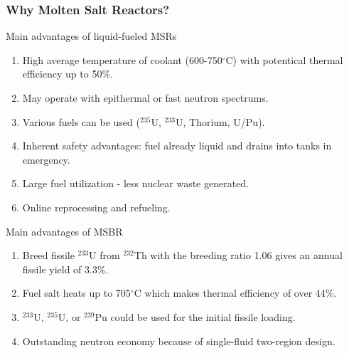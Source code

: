 \begin{frame}
  \frametitle{Why Molten Salt Reactors?}
                  \vspace*{-0.1in}
              \begin{block}{Main advantages of liquid-fueled \glspl{MSR}}
               \begin{enumerate}
                \item High average temperature of coolant (600-750$^{\circ}$C) with potentical thermal efficiency up to 50\%.
                \item May operate with epithermal or fast neutron spectrums.
                \item Various fuels can be used ($^{235}$U, $^{233}$U, Thorium, U/Pu).
                \item Inherent safety advantages: fuel already liquid and drains into tanks in emergency.
                \item Large fuel utilization - less nuclear waste generated.
                \item Online reprocessing and refueling.
               \end{enumerate}
               \end{block}
               
               \begin{block}{Main advantages of \gls{MSBR}}
               \begin{enumerate}
                \item Breed fissile $^{233}$U from $^{232}$Th with the breeding ratio 1.06 gives an annual 
                fissile yield of 3.3\%.
                \item Fuel salt heats up to 705$^{\circ}$C which makes thermal efficiency of over 44\%.
                \item $^{233}$U, $^{235}$U, or $^{239}$Pu could be used for the initial fissile loading.
                \item Outstanding neutron economy because of single-fluid two-region design.
               \end{enumerate}
               \end{block}

\end{frame}

